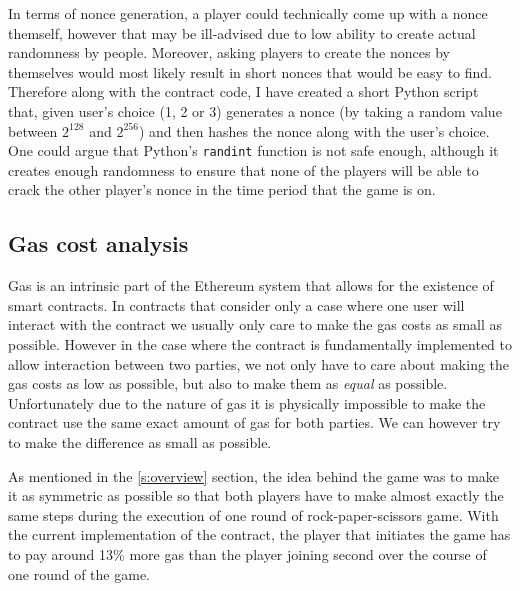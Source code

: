 \documentclass{article}
\begin{document}
    \noindent In terms of nonce generation, a player could
    technically come up with a nonce themself, however that
    may be ill-advised due to low ability to create actual
    randomness by people. Moreover, asking players to create
    the nonces by themselves would most likely result in
    short nonces that would be easy to find. Therefore along
    with the contract code, I have created a short Python
    script that, given user's choice (1, 2 or 3) generates a
    nonce (by taking a random value between \(2^{128}\) and
    \(2^{256}\)) and then hashes the nonce along with the
    user's choice. One could argue that Python's
    \verb|randint| function is not safe enough, although it
    creates enough randomness to ensure that none of the
    players will be able to crack the other player's nonce
    in the time period that the game is on.

    \subsection{Gas cost analysis}
    Gas is an intrinsic part of the Ethereum system that
    allows for the existence of smart contracts. In
    contracts that consider only a case where one user will
    interact with the contract we usually only care to make
    the gas costs as small as possible. However in the case
    where the contract is fundamentally implemented to allow
    interaction between two parties, we not only have to
    care about making the gas costs as low as possible, but
    also to make them as {\itshape equal} as possible.
    Unfortunately due to the nature of gas it is physically
    impossible to make the contract use the same exact
    amount of gas for both parties. We can however try to
    make the difference as small as possible.
    \newline

    \noindent As mentioned in the \ref{s:overview} section,
    the idea behind the game was to make it as symmetric as
    possible so that both players have to make almost
    exactly the same steps during the execution of one round
    of rock-paper-scissors game. With the current
    implementation of the contract, the player that
    initiates the game has to pay around 13\% more gas than
    the player joining second over the course of one round
    of the game.
    \newline
\end{document}
